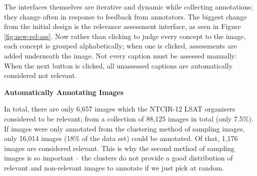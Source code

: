 The interfaces themselves are iterative and dynamic while collecting annotations; they change often in response to feedback from annotators. The biggest change from the initial design is the relevance assessment interface, as seen in Figure \ref{fig:new-rel-ass}. Now rather than clicking to judge every concept to the image, each concept is grouped alphabetically; when one is clicked, assessments are added underneath the image. Not every caption must be assessed manually: When the next button is clicked, all unassessed captions are automatically considered not relevant.

\textbf{Automatically Annotating Images}

In total, there are only 6,657 images which the NTCIR-12 LSAT organisers considered to be relevant; from a collection of 88,125 images in total (only 7.5\%). If images were only annotated from the clustering method of sampling images, only 16,014 images (18\% of the data set) could be annotated. Of that, 1,176 images are considered relevant. This is why the second method of sampling images is so important -- the clusters do not provide a good distribution of relevant and non-relevant images to annotate if we just pick at random.





